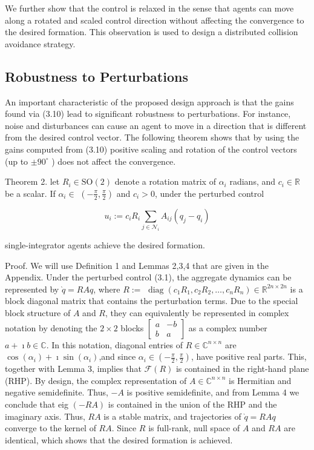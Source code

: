 \documentclass[10pt]{article}
\begin{document}
We further show that the control is relaxed in the sense that agents can move along a rotated and scaled control direction without affecting the convergence to the desired formation. This observation is used to design a distributed collision avoidance strategy.

\subsection{Robustness to Perturbations}
An important characteristic of the proposed design approach is that the gains found via (3.10) lead to significant robustness to perturbations. For instance, noise and disturbances can cause an agent to move in a direction that is different from the desired control vector. The following theorem shows that by using the gains computed from (3.10) positive scaling and rotation of the control vectors (up to $\pm 90^{\circ}$ ) does not affect the convergence.

Theorem 2. let $R_{i} \in \mathrm{SO}(2)$ denote a rotation matrix of $\alpha_{i}$ radians, and $c_{i} \in \mathbb{R}$ be a scalar. If $\alpha_{i} \in$ $\left(-\frac{\pi}{2}, \frac{\pi}{2}\right)$ and $c_{i}>0$, under the perturbed control

$$
u_{i}:=c_{i} R_{i} \sum_{j \in \mathcal{N}_{i}} A_{i j}\left(q_{j}-q_{i}\right)
$$

single-integrator agents achieve the desired formation.

Proof. We will use Definition 1 and Lemmas 2,3,4 that are given in the Appendix. Under the perturbed control (3.1), the aggregate dynamics can be represented by $\grave{q}=R A q$, where $R:=$ $\operatorname{diag}\left(c_{1} R_{1}, c_{2} R_{2}, \ldots, c_{n} R_{n}\right) \in \mathbb{R}^{2 n \times 2 n}$ is a block diagonal matrix that contains the perturbation terms. Due to the special block structure of $A$ and $R$, they can equivalently be represented in complex notation by denoting the $2 \times 2$ blocks $\left[\begin{array}{cc}a & -b \\ b & a\end{array}\right]$ as a complex number $a+\imath b \in \mathbb{C}$. In this notation, diagonal entries of $R \in \mathbb{C}^{n \times n}$ are $\cos \left(\alpha_{i}\right)+\imath \sin \left(\alpha_{i}\right)$,and since $\alpha_{i} \in\left(-\frac{\pi}{2}, \frac{\pi}{2}\right)$, have positive real parts. This, together with Lemma 3, implies that $\mathcal{F}(R)$ is contained in the right-hand plane (RHP). By design, the complex representation of $A \in \mathbb{C}^{n \times n}$ is Hermitian and negative semidefinite. Thus, $-A$ is positive semidefinite, and from Lemma 4 we conclude that eig $(-R A)$ is contained in the union of the RHP and the imaginary axis. Thus, $R A$ is a stable matrix, and trajectories of $\grave{q}=R A q$ converge to the kernel of $R A$. Since $R$ is full-rank, null space of $A$ and $R A$ are identical, which shows that the desired formation is achieved.
\end{document}
